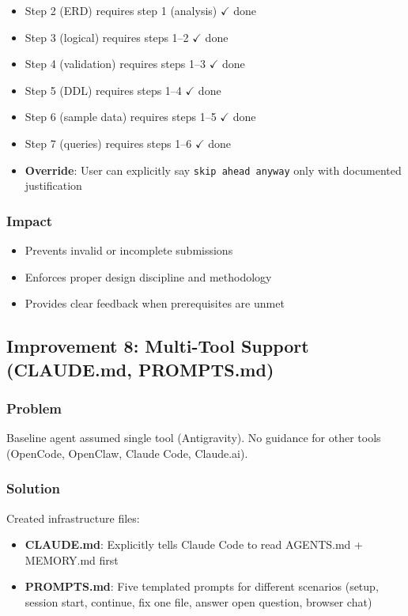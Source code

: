 \documentclass[12pt,a4paper]{article}
\begin{document}
\begin{itemize}
    \item Step 2 (ERD) requires step 1 (analysis) $\checkmark$ done
    \item Step 3 (logical) requires steps 1--2 $\checkmark$ done
    \item Step 4 (validation) requires steps 1--3 $\checkmark$ done
    \item Step 5 (DDL) requires steps 1--4 $\checkmark$ done
    \item Step 6 (sample data) requires steps 1--5 $\checkmark$ done
    \item Step 7 (queries) requires steps 1--6 $\checkmark$ done
    \item \textbf{Override}: User can explicitly say \texttt{skip ahead anyway} only with documented justification
\end{itemize}

\subsubsection{Impact}
\begin{itemize}
    \item Prevents invalid or incomplete submissions
    \item Enforces proper design discipline and methodology
    \item Provides clear feedback when prerequisites are unmet
\end{itemize}

\subsection{Improvement 8: Multi-Tool Support (CLAUDE.md, PROMPTS.md)}

\subsubsection{Problem}
Baseline agent assumed single tool (Antigravity). No guidance for other tools (OpenCode, OpenClaw, Claude Code, Claude.ai).

\subsubsection{Solution}
Created infrastructure files:

\begin{itemize}
    \item \textbf{CLAUDE.md}: Explicitly tells Claude Code to read AGENTS.md + MEMORY.md first
    \item \textbf{PROMPTS.md}: Five templated prompts for different scenarios (setup, session start, continue, fix one file, answer open question, browser chat)
\end{itemize}
\end{document}
